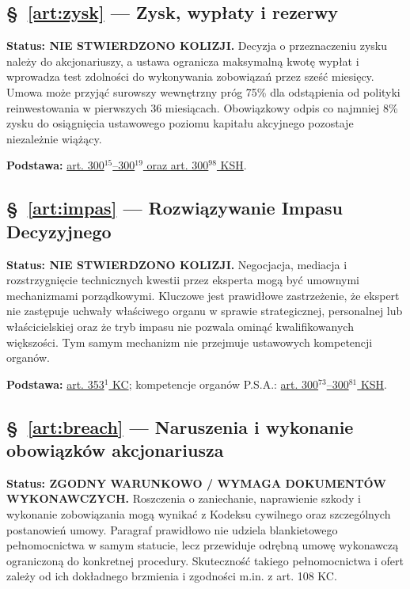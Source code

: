 \documentclass[12pt,a4paper]{report}
\begin{document}
\subsection*{§~\ref{art:zysk} — Zysk, wypłaty i rezerwy}
\textbf{Status: NIE STWIERDZONO KOLIZJI.} Decyzja o przeznaczeniu zysku należy do akcjonariuszy, a ustawa ogranicza maksymalną kwotę wypłat i wprowadza test zdolności do wykonywania zobowiązań przez sześć miesięcy. Umowa może przyjąć surowszy wewnętrzny próg 75\% dla odstąpienia od polityki reinwestowania w pierwszych 36 miesiącach. Obowiązkowy odpis co najmniej 8\% zysku do osiągnięcia ustawowego poziomu kapitału akcyjnego pozostaje niezależnie wiążący.

\textbf{Podstawa:} \href{https://eli.gov.pl/api/acts/DU/2024/18/text.html}{art. 300$^{15}$--300$^{19}$ oraz art. 300$^{98}$ KSH}.

\subsection*{§~\ref{art:impas} — Rozwiązywanie Impasu Decyzyjnego}
\textbf{Status: NIE STWIERDZONO KOLIZJI.} Negocjacja, mediacja i rozstrzygnięcie technicznych kwestii przez eksperta mogą być umownymi mechanizmami porządkowymi. Kluczowe jest prawidłowe zastrzeżenie, że ekspert nie zastępuje uchwały właściwego organu w sprawie strategicznej, personalnej lub właścicielskiej oraz że tryb impasu nie pozwala ominąć kwalifikowanych większości. Tym samym mechanizm nie przejmuje ustawowych kompetencji organów.

\textbf{Podstawa:} \href{https://eli.gov.pl/eli/DU/2026/795/ogl}{art. 353$^{1}$ KC}; kompetencje organów P.S.A.: \href{https://eli.gov.pl/api/acts/DU/2024/18/text.html}{art. 300$^{73}$--300$^{81}$ KSH}.

\subsection*{§~\ref{art:breach} — Naruszenia i wykonanie obowiązków akcjonariusza}
\textbf{Status: ZGODNY WARUNKOWO / WYMAGA DOKUMENTÓW WYKONAWCZYCH.} Roszczenia o zaniechanie, naprawienie szkody i wykonanie zobowiązania mogą wynikać z Kodeksu cywilnego oraz szczególnych postanowień umowy. Paragraf prawidłowo nie udziela blankietowego pełnomocnictwa w samym statucie, lecz przewiduje odrębną umowę wykonawczą ograniczoną do konkretnej procedury. Skuteczność takiego pełnomocnictwa i ofert zależy od ich dokładnego brzmienia i zgodności m.in. z art. 108 KC.
\end{document}
